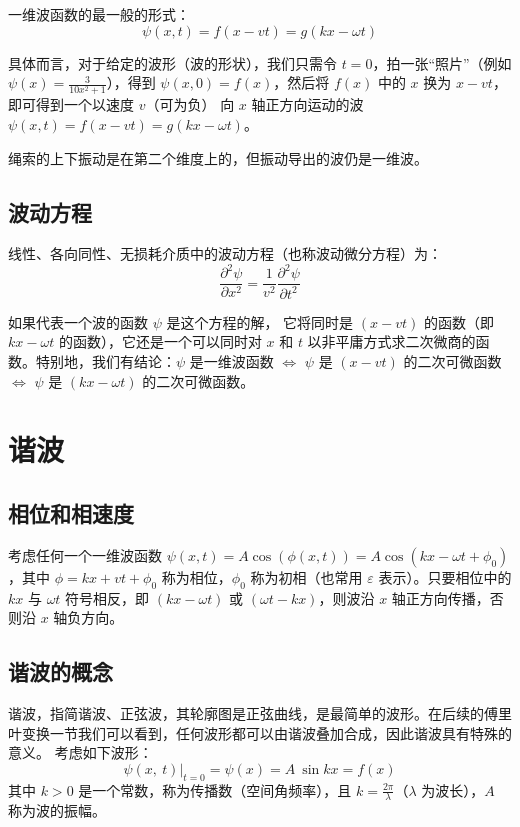 \documentclass[UTF8]{report}
\theoremstyle{MyLineTheoremStyle} %
\theoremstyle{MyBlockTheoremStyle} %
\theoremstyle{MySubsubsectionStyle} %
\begin{document}
一维波函数的最一般的形式：
\begin{equation}
\psi(x,t) = f(x-vt) = g(kx - \omega t)
\end{equation}

具体而言，对于给定的波形（波的形状），我们只需令 $t=0$，拍一张“照片”（例如 $\psi(x) = \frac{3}{10x^2+1}$），得到 $\psi(x,0) = f(x)$，然后将 $f(x)$ 中的 $x$ 换为 $x-vt$，即可得到一个以速度 $v$（可为负） 向 $x$ 轴正方向运动的波 $\psi(x,t) = f(x - vt) = g(kx - \omega t)$。
{\par\color{gray}\small
绳索的上下振动是在第二个维度上的，但振动导出的波仍是一维波。
\par}


\subsection{波动方程}

线性、各向同性、无损耗介质中的波动方程（也称波动微分方程）为：
\begin{equation}
    \frac{\partial^{2}\psi}{\partial x^{2}}=\frac{1}{v^{2}}\frac{\partial^{2}\psi}{\partial t^{2}} 
\end{equation}

如果代表一个波的函数 $\psi$ 是这个方程的解， 它将同时是 $(x-vt)$ 的函数（即 $kx - \omega t$ 的函数），它还是一个可以同时对 $x$ 和 $t$ 以非平庸方式求二次微商的函数。特别地，我们有结论：$\psi$ 是一维波函数 $\Longleftrightarrow$ $\psi$ 是 $(x-vt)$ 的二次可微函数 $\Longleftrightarrow$ $\psi$ 是 $(kx - \omega t)$ 的二次可微函数。

\section{谐波}

\subsection{相位和相速度}
考虑任何一个一维波函数 $\psi(x,t) = A \cos(\phi(x,t)) = A \cos (kx - \omega t + \phi_0) $，其中 $\phi = kx+vt + \phi_0$ 称为相位，$\phi_0$ 称为初相（也常用 $\varepsilon$ 表示）。只要相位中的 $kx$ 与 $\omega t$ 符号相反，即 $(kx - \omega t)$ 或 $(\omega t - kx)$，则波沿 $x$ 轴正方向传播，否则沿 $x$ 轴负方向。


\subsection{谐波的概念} 
谐波，指简谐波、正弦波，其轮廓图是正弦曲线，是最简单的波形。在后续的傅里叶变换一节我们可以看到，任何波形都可以由谐波叠加合成，因此谐波具有特殊的意义。
考虑如下波形：
\begin{equation}
    \psi(x,\:t)\big|_{t=0}=\psi(x)=A\:\sin kx=f(x)
\end{equation}
其中 $k>0$ 是一个常数，称为传播数（空间角频率），且 $k = \frac{2\pi}{\lambda} $（$\lambda$ 为波长），$A$ 称为波的振幅。\par
\end{document}
